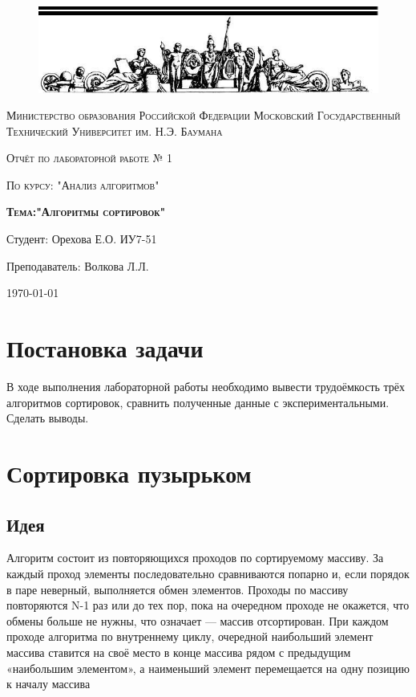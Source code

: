 \documentclass[a4paper,12pt]{article}
\begin{document}
\begin{titlepage}
	\centering
    \begin{figure}[H]
    	\includegraphics[scale=1.2]{photo}
   	\end{figure}
	{\scshape Министерство образования Российской Федерации
Московский Государственный Технический Университет им. Н.Э. Баумана \par}
	\vspace{4cm}
	{\scshape\Large Отчёт по лабораторной работе № 1\par}
    {\scshape\Large По курсу: "Анализ алгоритмов"\par}
	{\scshape\Large\bf Тема:"Алгоритмы сортировок"\par}
    \vspace{4cm}
    {\flushright Студент: Орехова Е.О. ИУ7-51\par
    \flushright Преподаватель: Волкова Л.Л.\par}
    \vspace{3cm}
	{\large \today\par}
\end{titlepage}

\def\contentaname{Содержание}
\tableofcontents %
\clearpage

\section{Постановка задачи}
    В ходе выполнения лабораторной работы необходимо вывести трудоёмкость трёх алгоритмов сортировок, сравнить полученные данные с экспериментальными. Сделать выводы.

\section{Сортировка пузырьком}
	\subsection{Идея}
	Алгоритм состоит из повторяющихся проходов по сортируемому массиву. За каждый проход элементы последовательно сравниваются попарно и, если порядок в паре неверный, выполняется обмен элементов. Проходы по массиву повторяются N-1 раз или до тех пор, пока на очередном проходе не окажется, что обмены больше не нужны, что означает — массив отсортирован. При каждом проходе алгоритма по внутреннему циклу, очередной наибольший элемент массива ставится на своё место в конце массива рядом с предыдущим «наибольшим элементом», а наименьший элемент перемещается на одну позицию к началу массива
\end{document}
